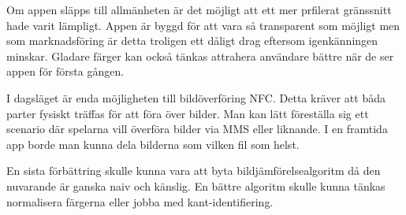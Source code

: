 \documentclass[11px, a4paper, twocolumn]{article}
\begin{document}
	Om appen släpps till allmänheten är det möjligt att ett mer prfilerat gränssnitt hade varit lämpligt. Appen är byggd för att vara så transparent som möjligt men som marknadsföring är detta troligen ett dåligt drag eftersom igenkänningen minskar. Gladare färger kan också tänkas attrahera användare bättre när de ser appen för första gången.

	I dagsläget är enda möjligheten till bildöverföring NFC. Detta kräver att båda parter fysiskt träffas för att föra över bilder. Man kan lätt föreställa sig ett scenario där spelarna vill överföra bilder via MMS eller liknande. I en framtida app borde man kunna dela bilderna som vilken fil som helst.

	En sista förbättring skulle kunna vara att byta bildjämförelsealgoritm då den nuvarande är ganska naiv och känslig. En bättre algoritm skulle kunna tänkas normalisera färgerna eller jobba med kant-identifiering.



\begingroup
\raggedright


\endgroup
\end{document}
